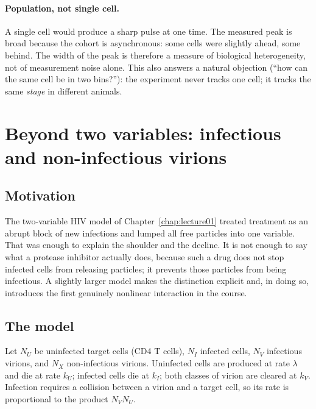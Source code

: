 \paragraph{Population, not single cell.} A single cell would produce a sharp pulse at one time. The measured peak is broad because the cohort is asynchronous: some cells were slightly ahead, some behind. The width of the peak is therefore a measure of biological heterogeneity, not of measurement noise alone. This also answers a natural objection (``how can the same cell be in two bins?''): the experiment never tracks one cell; it tracks the same \emph{stage} in different animals.

\section{Beyond two variables: infectious and non-infectious virions}\label{sec:lec02:hiv4}

\subsection*{Motivation}
The two-variable HIV model of Chapter~\ref{chap:lecture01} treated treatment as an abrupt block of new infections and lumped all free particles into one variable. That was enough to explain the shoulder and the decline. It is not enough to say what a protease inhibitor actually does, because such a drug does not stop infected cells from releasing particles; it prevents those particles from being infectious. A slightly larger model makes the distinction explicit and, in doing so, introduces the first genuinely nonlinear interaction in the course.

\subsection{The model}\label{subsec:lec02:hiv4-model}
Let $N_U$ be uninfected target cells (CD4 T cells), $N_I$ infected cells, $N_V$ infectious virions, and $N_X$ non-infectious virions. Uninfected cells are produced at rate $\lambda$ and die at rate $k_U$; infected cells die at $k_I$; both classes of virion are cleared at $k_V$. Infection requires a collision between a virion and a target cell, so its rate is proportional to the product $N_VN_U$.

